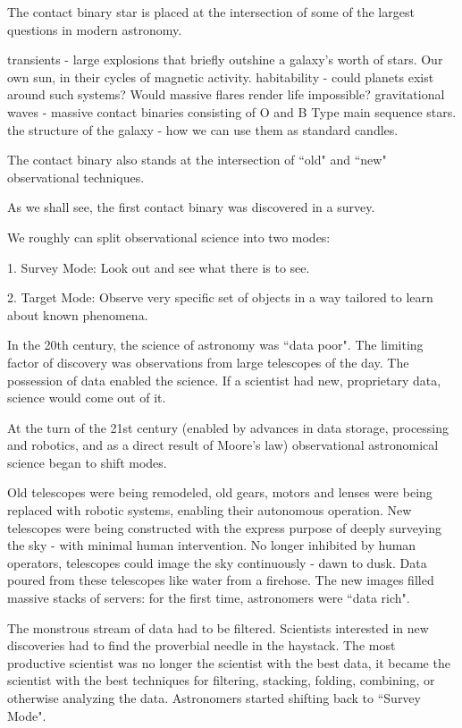 \documentclass[12pt]{article} %
\numberwithin{equation}{section} %
\begin{document}
The contact binary star is placed at the intersection of some of the largest questions in modern astronomy.

transients - large explosions that briefly outshine a galaxy's worth of stars.
Our own sun, in their cycles of magnetic activity.
habitability - could planets exist around such systems? Would massive flares render life impossible?
gravitational waves - massive contact binaries consisting of O and B Type main sequence stars.
the structure of the galaxy - how we can use them as standard candles. 


The contact binary also stands at the intersection of ``old" and ``new" observational techniques. 

As we shall see, the first contact binary was discovered in a survey. 

We roughly can split observational science into two modes:

1. Survey Mode: Look out and see what there is to see.

2. Target Mode: Observe very specific set of objects in a way tailored to learn about known phenomena.

In the 20th century, the science of astronomy was ``data poor". The limiting factor of discovery was observations from large telescopes of the day. The possession of data enabled the science. If a scientist had new, proprietary data, science would come out of it.

At the turn of the 21st century (enabled by advances in data storage, processing and robotics, and as a direct result of Moore's law) observational astronomical science began to shift modes.

Old telescopes were being remodeled, old gears, motors and lenses were being replaced with robotic systems, enabling their autonomous operation. New telescopes were being constructed with the express purpose of deeply surveying the sky - with minimal human intervention. No longer inhibited by human operators, telescopes could image the sky continuously - dawn to dusk. Data poured from these telescopes like water from a firehose. The new images filled massive stacks of servers: for the first time, astronomers were ``data rich". 

The monstrous stream of data had to be filtered. Scientists interested in new discoveries had to find the proverbial needle in the haystack. The most productive scientist was no longer the scientist with the best data, it became the scientist with the best techniques for filtering, stacking, folding, combining, or otherwise analyzing the data. Astronomers started shifting back to ``Survey Mode".
\end{document}
